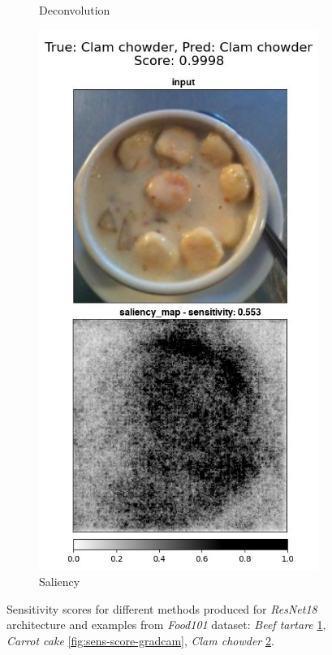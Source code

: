 \begin{figure}[ht]
\begin{subfigure}{.31\textwidth}
    \caption{Deconvolution}\label{fig:sens-score-deconv}
\end{subfigure}
 \begin{subfigure}{.345\textwidth}
    \centering
    \includegraphics[width=\textwidth]{results/metrics/1246-Clam chowder-Clam chowder_vert.jpg}
    \caption{Saliency}\label{fig:sens-score-saliency}
\end{subfigure}

 \caption{Sensitivity scores for different methods produced for \textit{ResNet18} architecture and examples from \textit{Food101} dataset: \textit{Beef tartare} \ref{fig:sens-score-deconv}, \textit{Carrot cake} \ref{fig:sens-score-gradcam}, \textit{Clam chowder} \ref{fig:sens-score-saliency}.}\label{fig:sens-scores-examples}
\end{figure}

